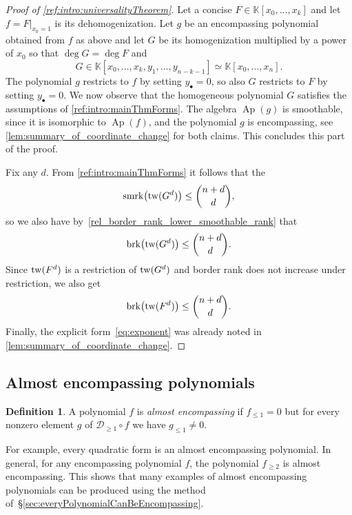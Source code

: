\documentclass[a4paper,11pt,reqno]{amsart}
\newcommand{\calD}{\mathcal{D}}
\newcommand{\bbK}{\mathbb{K}}
\DeclareMathOperator{\Ap}{Ap}
\DeclareMathOperator{\brk}{brk}
\DeclareMathOperator{\smrk}{smrk}
\numberwithin{equation}{section}
\theoremstyle{definition}
\newtheorem{defn}[equation]{Definition}
\theoremstyle{plain}
\theoremstyle{remark}
\begin{document}
\begin{proof}[Proof of \autoref{ref:intro:universalityTheorem}]
    Let a concise $F\in \bbK[x_0, \ldots ,x_k]$ and let $f =
    F|_{x_0=1}$ is its dehomogenization. Let $g$ be an encompassing polynomial
    obtained from $f$ as above and let $G$ be its homogenization {multiplied} by a power of $x_0$ so that $\deg G=\deg F$ and \[G
    \in\bbK[x_0, \ldots ,x_k,y_1, \ldots ,y_{n-k-1}] \simeq \bbK[x_0, \ldots
    ,x_n].\]
    The polynomial $g$ restricts to $f$ by setting $y_{\bullet} = 0$, so {also
    $G$} restricts to $F$ by setting $y_{\bullet} = 0$.
    We now observe that the homogeneous polynomial $G$ satisfies the assumptions of
    \autoref{ref:intro:mainThmForms}.  The algebra $\Ap(g)$ is smoothable,
    since it is isomorphic to $\Ap(f)$, and the polynomial $g$ is
    encompassing, see \autoref{lem:summary_of_coordinate_change} for both
    claims. This {concludes} this part of the proof.

  Fix any $d$. From \autoref{ref:intro:mainThmForms} it follows that the
  \[
      \smrk\bigl(\twist{G^d}\bigr) \leq\binom{n+d}{d},
  \]
  so we also have by~\eqref{rel_border_rank_lower_smoothable_rank} that
    \[
        \brk\bigl(\twist{G^d}\bigr)\leq\binom{n+d}{d}.
    \]
    Since $\mathrm{tw}(F^d)$ is a
    restriction of $\mathrm{tw}(G^d)$ and border rank does not increase under restriction,
    we also get \[\brk\bigl(\twist{F^d}\bigr)\leq\binom{n+d}{d}.\]
    Finally, the explicit form~\eqref{eq:exponent} was already noted in
    \autoref{lem:summary_of_coordinate_change}.
\end{proof}

\subsection{Almost encompassing polynomials}\label{sec:almostEncompassing}

\begin{defn}
    A polynomial $f$ is \emph{almost encompassing} if $f_{\leq 1} = 0$ but for
    every nonzero element $g$ of $\calD_{\geq 1}\circ f$ we have $g_{\leq 1} \neq 0$.
\end{defn}
For example, {every} quadratic form is an almost encompassing polynomial. In
general, for any encompassing polynomial $f$, the polynomial $f_{\geq 2}$ is
almost encompassing. This shows that {many} examples of almost encompassing
polynomials can be produced using the method
{of}~\S\ref{sec:everyPolynomialCanBeEncompassing}.
\end{document}
